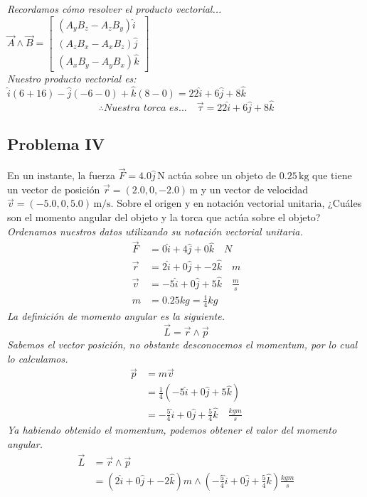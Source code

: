\documentclass{article}
\begin{document}
    \textit{Recordamos cómo resolver el producto vectorial...}
$    \vec{A} \land \vec{B} = \begin{bmatrix}
        (A_yB_z - A_zB_y) \hat{i} \\
        (A_zB_x - A_xB_z) \hat{j} \\
        (A_xB_y - A_yB_x) \hat{k}
        \end{bmatrix}$\\
\textit{Nuestro producto vectorial es: $\hat{i}(6+16) - \hat{j}(-6-0) + \hat{k}(8-0) = 22\hat{i} + 6\hat{j} + 8\hat{k}$} \\
\[ \therefore \textit{Nuestra torca es...} \quad \vec{\tau} = 22\hat{i} + 6\hat{j} + 8\hat{k} \]
\newpage    
\subsection*{Problema IV}
   En un instante, la fuerza \(\vec{F} = 4.0\hat{j}\,\text{N}\) actúa sobre un objeto de \(0.25\,\text{kg}\) que tiene un vector de posición \(\vec{r} = (2.0,0,-2.0)\,\text{m}\) y un vector de velocidad \(\vec{v} = (-5.0,0,5.0)\,\text{m/s}\). Sobre el origen y en notación vectorial unitaria, ¿Cuáles son el momento angular del objeto y la torca que actúa sobre el objeto? \\
   \textit{Ordenamos nuestros datos utilizando su notación vectorial unitaria.}
   \begin{align*}
    \vec{F} &= 0\hat{i} + 4\hat{j} + 0\hat{k} \quad N \\
    \vec{r} &= 2\hat{i} + 0\hat{j} + -2\hat{k} \quad m \\
    \vec{v} &= -5\hat{i} + 0\hat{j} + 5\hat{k} \quad \frac{m}{s}\\
    m &= 0.25kg = \frac{1}{4}kg
   \end{align*}
   \textit{La definición de momento angular es la siguiente.}
   \[ \vec{L} = \vec{r} \land \vec{p} \]
   \textit{Sabemos el vector posición, no obstante desconocemos el momentum, por lo cual lo calculamos.}
   \begin{align*}
    \vec{p} &= m\vec{v} \\
    &= \frac{1}{4}(-5\hat{i} + 0\hat{j} + 5\hat{k}) \\
    &= -\frac{5}{4}\hat{i} + 0\hat{j} + \frac{5}{4}\hat{k} \quad \frac{kgm}{s}
   \end{align*}
   \textit{Ya habiendo obtenido el momentum, podemos obtener el valor del momento angular.}   
\begin{align*}
    \vec{L} &= \vec{r} \land \vec{p} \\
    &= (2\hat{i} + 0\hat{j} + -2\hat{k})m \land \left( -\frac{5}{4}\hat{i} + 0\hat{j} + \frac{5}{4}\hat{k} \right)\frac{kgm}{s} \\
\end{align*}
\end{document}
